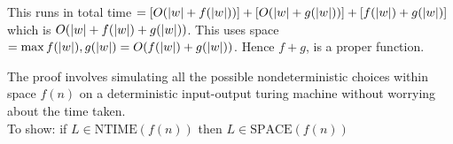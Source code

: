 This runs in total time $= [O(\lvert w\rvert+f(\lvert w\rvert))] + [O(\lvert w\rvert+g(\lvert w\rvert))]  
+ [f(\lvert w\rvert) + g(\lvert w\rvert)]$ which is $O(\lvert w\rvert+f(\lvert w\rvert)+g(\lvert w\rvert))$. 
This uses space $= \max{f(\lvert w\rvert),g(\lvert w\rvert)} = O(f(\lvert w\rvert) + g(\lvert w\rvert))$. 
Hence $f + g$, is a proper function.

\frmrule









\frmrule


\frmrule

The proof involves simulating all the possible nondeterministic choices 
within space $f(n)$ on a deterministic input-output turing machine
without worrying about the time taken.\\
To show: if $L \in \text{NTIME}(f(n))$ then $L \in \text{SPACE}(f(n))$


